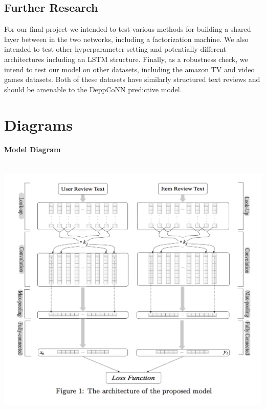 \documentclass[10pt,twocolumn,letterpaper]{article}
\begin{document}
\subsection{Further Research}

For our final project we intended to test various methods for building a shared layer between in the two networks, including a factorization machine. We also intended to test other hyperparameter setting and potentially different architectures including an LSTM structure. Finally, as a robustness check, we intend to test our model on other datasets, including the amazon TV and video games datasets. Both of these datasets have similarly structured text reviews and should be amenable to the DeppCoNN predictive model. 

\section{Diagrams}
\paragraph{Model Diagram} \ \newline
\includegraphics[scale=0.38]{DeepCoNN}
\end{document}
